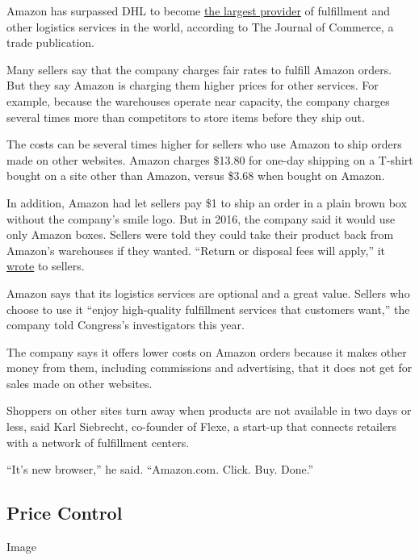 Amazon has surpassed DHL to become
\href{https://www.joc.com/international-logistics/logistics-providers/amazon-debuts-atop-global-3pl-rankings_20190420.html}{the
largest provider} of fulfillment and other logistics services in the
world, according to The Journal of Commerce, a trade publication.

Many sellers say that the company charges fair rates to fulfill Amazon
orders. But they say Amazon is charging them higher prices for other
services. For example, because the warehouses operate near capacity, the
company charges several times more than competitors to store items
before they ship out.

The costs can be several times higher for sellers who use Amazon to ship
orders made on other websites. Amazon charges \$13.80 for one-day
shipping on a T-shirt bought on a site other than Amazon, versus \$3.68
when bought on Amazon.

In addition, Amazon had let sellers pay \$1 to ship an order in a plain
brown box without the company's smile logo. But in 2016, the company
said it would use only Amazon boxes. Sellers were told they could take
their product back from Amazon's warehouses if they wanted. ``Return or
disposal fees will apply,'' it
\href{https://sellercentral.amazon.com/forums/t/termination-of-brand-neutral-packaging-service/165894}{wrote}
to sellers.

Amazon says that its logistics services are optional and a great value.
Sellers who choose to use it ``enjoy high-quality fulfillment services
that customers want,'' the company told Congress's investigators this
year.

The company says it offers lower costs on Amazon orders because it makes
other money from them, including commissions and advertising, that it
does not get for sales made on other websites.

Shoppers on other sites turn away when products are not available in two
days or less, said Karl Siebrecht, co-founder of Flexe, a start-up that
connects retailers with a network of fulfillment centers.

``It's new browser,'' he said. ``Amazon.com. Click. Buy. Done.''

\hypertarget{price-control}{%
\subsection{Price Control}\label{price-control}}

Image

